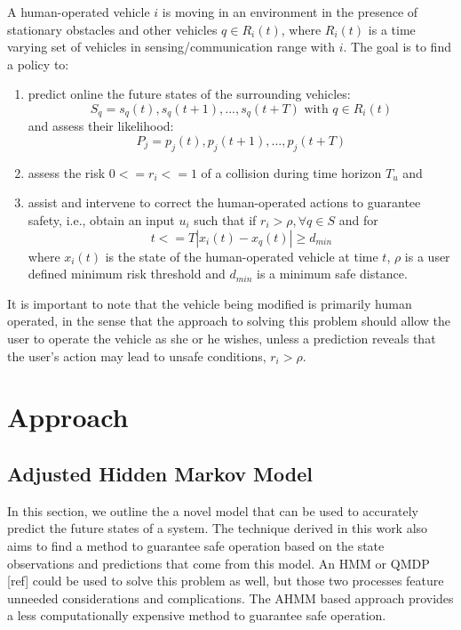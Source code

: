 \documentclass[conference]{IEEEtran}
\begin{document}
    A human-operated vehicle $i$ is moving in an environment in the presence of stationary obstacles and other vehicles $q \in R_i(t)$, where $R_i(t)$ is a time varying set of vehicles in sensing/communication range with $i$. The goal is to find a policy to:
    \begin{enumerate}
        \item  predict online the future states of the surrounding vehicles:
    \begin{equation}
    S_q={s_q(t), s_q(t+1),..., s_q(t+T)} \text{ with } q \in R_i(t)
    \end{equation}
    and assess their likelihood:
    \begin{equation}
    P_j={p_j(t), p_j(t+1),..., p_j(t+T)}
    \end{equation}
    \item assess the risk $0<= r_i <=1$ of a collision during time horizon $T_u$ and
    \item assist and intervene to correct the human-operated actions to guarantee safety, i.e., obtain an input $u_i$ such that if $r_i>\rho, \forall q \in S$ and for 
    \begin{equation}
    t<=T |x_i(t)-x_q(t)| \geq d_{min}
    \end{equation}
     where $x_i(t)$ is the state of the human-operated vehicle at time $t$, $\rho$ is a user defined minimum risk threshold and $d_{min}$ is a minimum safe distance.
    \end{enumerate}
    
    It is important to note that the vehicle being modified is primarily human operated, in the sense that the approach to solving this problem should allow the user to operate the vehicle as she or he wishes, unless a prediction reveals that the user's action may lead to unsafe conditions, $r_i > \rho$.

\section{Approach}

\subsection{Adjusted Hidden Markov Model}
In this section, we outline the a novel model that can be used to accurately predict the future states of a system. The technique derived in this work also aims to find a method to guarantee safe operation based on the state observations and predictions that come from this model. An HMM or QMDP [ref] could be used to solve this problem as well, but those two processes feature unneeded considerations and complications. The AHMM based approach provides a less computationally expensive method to guarantee safe operation.
\end{document}
